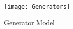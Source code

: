 \begin{enumerate}
	\begin{figure}[H]
	 \centering
	\texttt{[image: Generators]}
	\caption{Generator Model}
	\label{GM}
	\end{figure}
	\begin{itemize}
%		
%		
%		
%		
%		
%		
%		
		

\end{itemize}
\end{enumerate}
